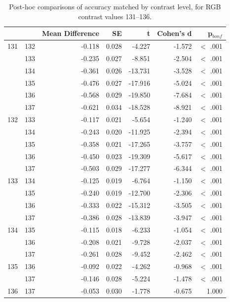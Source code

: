 \begin{table}[htb]
	\centering
	\caption{Post-hoc comparisons of accuracy matched by contrast level, for RGB contrast values 131--136.}
	\begin{tabular}{lrrrrrr}
		\hline
		 &  & Mean Difference & SE & t & Cohen's d & p$_{bonf}$  \\
		\hline
		131 & 132 & -0.118 & 0.028 & -4.227 & -1.572 & $<$ .001  \\
		  & 133 & -0.235 & 0.027 & -8.851 & -2.504 & $<$ .001  \\
		 & 134 & -0.361 & 0.026 & -13.731 & -3.528 & $<$ .001  \\
		 & 135 & -0.476 & 0.027 & -17.916 & -5.024 & $<$ .001  \\
		 & 136 & -0.568 & 0.029 & -19.850 & -7.684 & $<$ .001  \\
		 & 137 & -0.621 & 0.034 & -18.528 & -8.921 & $<$ .001  \\
		132 & 133 & -0.117 & 0.021 & -5.654 & -1.240 & $<$ .001  \\
		  & 134 & -0.243 & 0.020 & -11.925 & -2.394 & $<$ .001  \\
		 & 135 & -0.358 & 0.021 & -17.265 & -3.757 & $<$ .001  \\
		 & 136 & -0.450 & 0.023 & -19.309 & -5.617 & $<$ .001  \\
		 & 137 & -0.503 & 0.029 & -17.277 & -6.344 & $<$ .001  \\
		133 & 134 & -0.125 & 0.019 & -6.764 & -1.150 & $<$ .001  \\
		  & 135 & -0.240 & 0.019 & -12.700 & -2.306 & $<$ .001  \\
		 & 136 & -0.333 & 0.022 & -15.312 & -3.505 & $<$ .001  \\
		 & 137 & -0.386 & 0.028 & -13.839 & -3.947 & $<$ .001  \\
		134 & 135 & -0.115 & 0.018 & -6.233 & -1.054 & $<$ .001  \\
		  & 136 & -0.208 & 0.021 & -9.728 & -2.037 & $<$ .001  \\
		 & 137 & -0.261 & 0.028 & -9.452 & -2.462 & $<$ .001  \\
		135 & 136 & -0.092 & 0.022 & -4.262 & -0.968 & $<$ .001  \\
		  & 137 & -0.146 & 0.028 & -5.224 & -1.478 & $<$ .001  \\
		136 & 137 & -0.053 & 0.030 & -1.778 & -0.675 & 1.000  \\
		\hline
	\end{tabular} 
\end{table}
\label{tab:ttest_MatchedContrastAcc}

